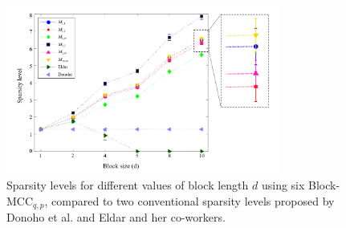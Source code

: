 \begin{figure}[!b]
\centering
\includegraphics[width=0.8\textwidth,keepaspectratio]{images/SL_Opt_PhiOrt_Eldar_Donoho.png}
\centering
\caption{Sparsity levels for different values of block length $d$ using six Block-MCC$_{q,p}$, compared to two conventional sparsity levels proposed by Donoho et al. and Eldar and her co-workers.}
\label{fig:SL_Opt_PhiOrt_Eldar_Donoho}
\end{figure}